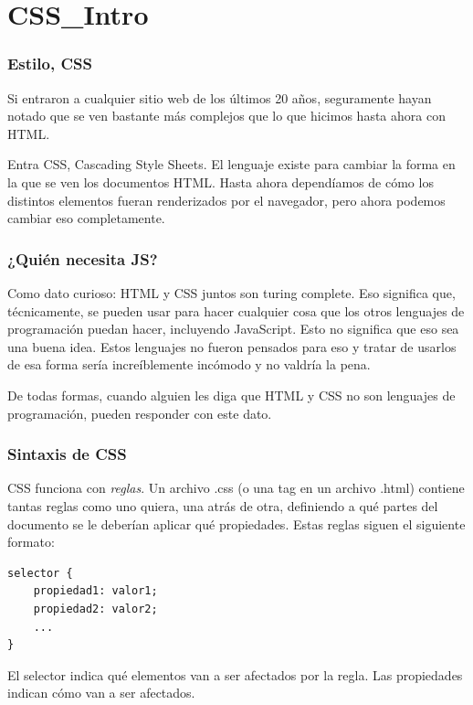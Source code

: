 \section{CSS_Intro}\label{sec:CSS_Intro}

\begin{frame}
    \frametitle{Estilo, CSS}
    
    Si entraron a cualquier sitio web de los últimos 20 años, seguramente hayan notado 
    que se ven bastante más complejos que lo que hicimos hasta ahora con HTML.

    Entra CSS, Cascading Style Sheets. El lenguaje existe para cambiar la 
    forma en la que se ven los documentos HTML. Hasta ahora dependíamos de 
    cómo los distintos elementos fueran renderizados por el navegador, pero 
    ahora podemos cambiar eso completamente.

\end{frame}

\begin{frame}
    \frametitle{¿Quién necesita JS?}

    Como dato curioso: HTML y CSS juntos son turing complete. Eso significa que, 
    técnicamente, se pueden usar para hacer cualquier cosa que los otros lenguajes 
    de programación puedan hacer, incluyendo JavaScript. Esto no significa que 
    eso sea una buena idea. Estos lenguajes no fueron pensados para eso y tratar 
    de usarlos de esa forma sería increíblemente incómodo y no valdría la pena.

    De todas formas, cuando alguien les diga que HTML y CSS no son lenguajes de 
    programación, pueden responder con este dato.

\end{frame}

\begin{frame}[fragile]
    \frametitle{Sintaxis de CSS}
    
    CSS funciona con \emph{reglas}. Un archivo .css (o una tag  
    en un archivo .html) contiene tantas reglas como uno quiera, una atrás de 
    otra, definiendo a qué partes del documento se le deberían aplicar qué 
    propiedades. Estas reglas siguen el siguiente formato:

    \begin{lstlisting}
selector {
    propiedad1: valor1;
    propiedad2: valor2;
    ...
}
    \end{lstlisting}

    El selector indica qué elementos van a ser afectados por la regla. Las 
    propiedades indican cómo van a ser afectados.

\end{frame}


